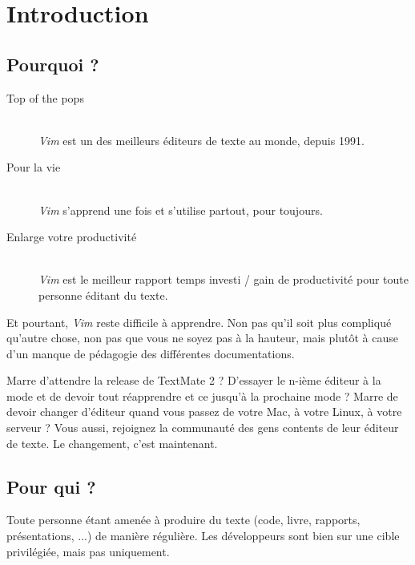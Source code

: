 \chapter*{Introduction}

\section{Pourquoi ?}

\begin{description}
    \item[Top of the pops] \hfill \\ \emph{Vim} est un des meilleurs éditeurs de texte au monde, depuis 1991.
    \item[Pour la vie] \hfill \\ \emph{Vim} s'apprend une fois et s'utilise partout, pour toujours.
    \item[Enlarge votre productivité] \hfill \\ \emph{Vim} est le meilleur rapport temps investi / gain de productivité pour toute personne éditant du texte.
\end{description}

Et pourtant, \emph{Vim} reste difficile à apprendre. Non pas qu'il soit plus compliqué qu'autre chose, non pas que vous ne soyez pas à la hauteur, mais plutôt à cause d'un manque de pédagogie des différentes documentations.

Marre d'attendre la release de TextMate 2 ? D'essayer le n-ième éditeur à la mode et de devoir tout réapprendre et ce jusqu'à la prochaine mode ? Marre de devoir changer d'éditeur quand vous passez de votre Mac, à votre Linux, à votre serveur ? Vous aussi, rejoignez la communauté des gens contents de leur éditeur de texte. Le changement, c'est maintenant.

\section{Pour qui ?}

Toute personne étant amenée à produire du texte (code, livre, rapports, présentations, ...) de manière régulière. Les développeurs sont bien sur une cible privilégiée, mais pas uniquement.

